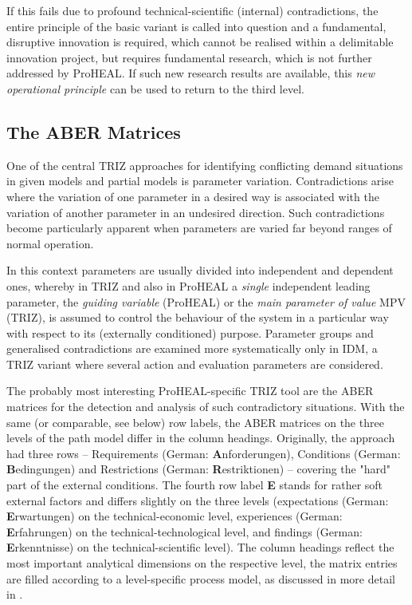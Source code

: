 \documentclass[11pt,a4paper]{article}
\begin{document}
If this fails due to profound technical-scientific (internal) contradictions,
the entire principle of the basic variant is called into question and a
fundamental, disruptive innovation is required, which cannot be realised
within a delimitable innovation project, but requires fundamental research,
which is not further addressed by ProHEAL. If such new research results are
available, this \emph{new operational principle} can be used to return to the
third level.

\subsection{The ABER Matrices}

One of the central TRIZ approaches for identifying conflicting demand
situations in given models and partial models is parameter variation.
Contradictions arise where the variation of one parameter in a desired way is
associated with the variation of another parameter in an undesired direction.
Such contradictions become particularly apparent when parameters are varied
far beyond ranges of normal operation.

In this context parameters are usually divided into independent and dependent
ones, whereby in TRIZ and also in ProHEAL a \emph{single} independent leading
parameter, the \emph{guiding variable} (ProHEAL) or the \emph{main parameter
  of value} MPV (TRIZ), is assumed to control the behaviour of the system in a
particular way with respect to its (externally conditioned) purpose. Parameter
groups and generalised contradictions are examined more systematically only in
IDM, a TRIZ variant where several action and evaluation parameters are
considered.

The probably most interesting ProHEAL-specific TRIZ tool are the ABER matrices
for the detection and analysis of such contradictory situations. With the same
(or comparable, see below) row labels, the ABER matrices on the three levels
of the path model differ in the column headings. Originally, the approach had
three rows -- Requirements (German: \textbf{A}nforderungen), Conditions
(German: \textbf{B}edingungen) and Restrictions (German:
\textbf{R}estriktionen) -- covering the "hard" part of the external
conditions.  The fourth row label \textbf{E} stands for rather soft external
factors and differs slightly on the three levels (expectations (German:
\textbf{E}rwartungen) on the technical-economic level, experiences (German:
\textbf{E}rfahrungen) on the technical-technological level, and findings
(German: \textbf{E}rkenntnisse) on the technical-scientific level). The column
headings reflect the most important analytical dimensions on the respective
level, the matrix entries are filled according to a level-specific process
model, as discussed in more detail in \cite{ProHEAL-21}.
\end{document}
